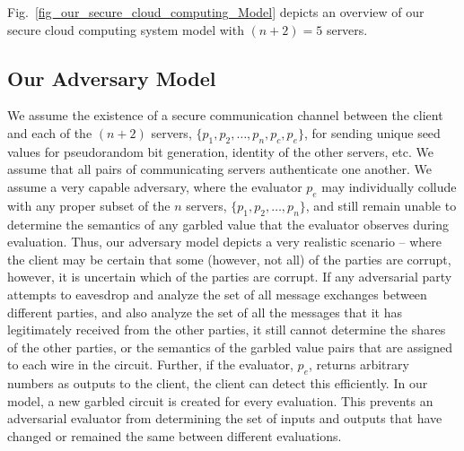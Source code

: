 \documentclass[10pt,journal,cspaper,compsoc]{IEEEtran}
\begin{document}
Fig.~\ref{fig_our_secure_cloud_computing_Model} depicts an overview of our secure cloud computing system model with $(n+2)=5$ servers.


\subsection{Our Adversary Model}
\label{sec_adversary_model}

We assume the existence of a secure communication channel between the client and each of the $(n+2)$ servers, $\{p_1, p_2, \ldots, p_n, p_c, p_e\}$, for sending unique seed values for pseudorandom bit generation, identity of the other servers, etc. We assume that all pairs of communicating servers authenticate one another. We assume a very capable adversary, where the evaluator $p_e$ may individually collude with any proper subset of the $n$ servers, $\{p_1, p_2, \ldots, p_n\}$, and still remain unable to determine the semantics of any garbled value that the evaluator observes during evaluation. Thus, our adversary model depicts a very realistic scenario -- where the client may be certain that some (however, not all) of the parties are corrupt, however, it is uncertain which of the parties are corrupt. If any adversarial party attempts to eavesdrop and analyze the set of all message exchanges between different parties, and also analyze the set of all the messages that it has legitimately received from the other parties, it still cannot determine the shares of the other parties, or the semantics of the garbled value pairs that are assigned to each wire in the circuit. Further, if the evaluator, $p_e$, returns arbitrary numbers as outputs to the client, the client can detect this efficiently. In our model, a new garbled circuit is created for every evaluation. This prevents an adversarial evaluator from determining the set of inputs and outputs that have changed or remained the same between different evaluations.
\end{document}
